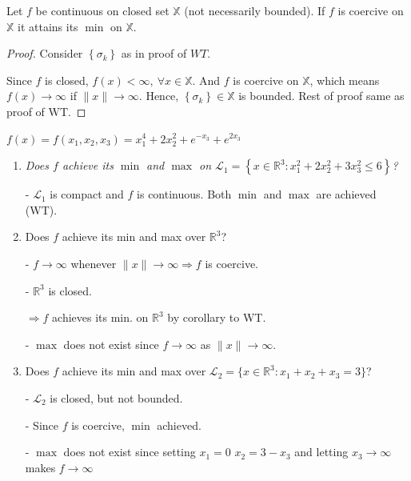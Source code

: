 \documentclass[11pt]{elegantbook}
\begin{document}
\begin{corollary}[Corollary to WT]
    Let $f$ be continuous on closed set $\mathbb{X}$ (not necessarily bounded). If $f$ is coercive on $\mathbb{X}$ it attains its $\min$ on $\mathbb{X}$.
\end{corollary}
\begin{proof}
    Consider $\left\{\sigma_{k}\right\}$ as in proof of $WT$.

    Since $f$ is closed, $f(x)<\infty,\ \forall x\in\mathbb{X}$. And $f$ is coercive on $\mathbb{X}$, which means $f(x)\rightarrow \infty$ if $\|x\| \rightarrow\infty$. Hence, $\left\{\sigma_{k}\right\}\in\mathbb{X}$ is bounded. Rest of proof same as proof of $\mathrm{WT}$.
\end{proof}

\begin{example}
    $f(x)=f\left(x_{1}, x_{2}, x_{3}\right)=x_{1}^{4}+2 x_{2}^{2}+e^{-x_{3}}+e^{2 x_{3}}$
\end{example}

\begin{enumerate}[1)]
    \item \textit{Does $f$ achieve its $\min$ and $\max$ on $\mathcal{L}_{1}=\left\{x \in \mathbb{R}^{3}: x_{1}^{2}+2 x_{2}^{2}+3 x_{3}^{2} \leqslant 6\right\}$?}
    
    - $\mathcal{L}_{1}$ is compact and $f$ is continuous. Both $\min$ and $\max$ are achieved (WT).
    \item Does $f$ achieve its min and max over $\mathbb{R}^{3}$?
    
    - $f \rightarrow \infty$ whenever $\|x\| \rightarrow \infty \Rightarrow f$ is coercive.

    - $\mathbb{R}^{3}$ is closed.

    $\Rightarrow f$ achieves its min. on $\mathbb{R}^{3}$ by corollary to WT.

    - $\max$ does not exist since $f \rightarrow \infty$ as $\|x\| \rightarrow \infty$.

    \item Does $f$ achieve its min and max over $\mathcal{L}_{2}=\{x \in \mathbb{R}^{3}: x_{1}+x_{2}+x_{3}=3\}$?
    
    - $\mathcal{L}_{2}$ is closed, but not bounded.

    - Since $f$ is coercive, $\min$ achieved.

    - $\max$ does not exist since setting $x_{1}=0$ $x_{2}=3-x_{3}$ and letting $x_{3} \rightarrow \infty$ makes $f \rightarrow \infty$
\end{enumerate}
\end{document}
